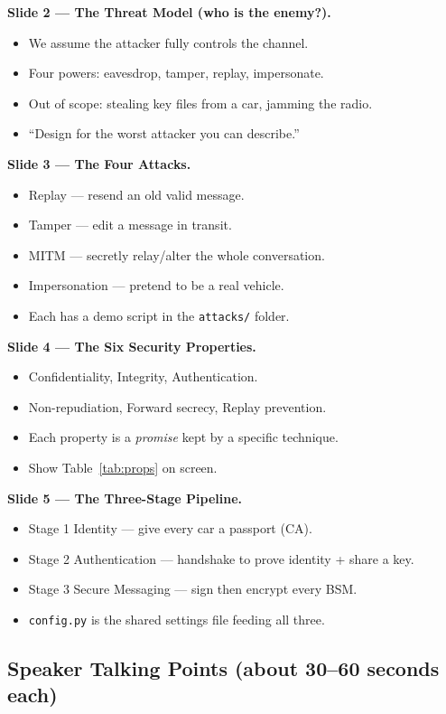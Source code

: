 \documentclass[11pt,a4paper]{report}
\begin{document}
\textbf{Slide 2 --- The Threat Model (who is the enemy?).}
\begin{itemize}
  \item We assume the attacker fully controls the channel.
  \item Four powers: eavesdrop, tamper, replay, impersonate.
  \item Out of scope: stealing key files from a car, jamming the radio.
  \item ``Design for the worst attacker you can describe.''
\end{itemize}

\textbf{Slide 3 --- The Four Attacks.}
\begin{itemize}
  \item Replay --- resend an old valid message.
  \item Tamper --- edit a message in transit.
  \item MITM --- secretly relay/alter the whole conversation.
  \item Impersonation --- pretend to be a real vehicle.
  \item Each has a demo script in the \texttt{attacks/} folder.
\end{itemize}

\textbf{Slide 4 --- The Six Security Properties.}
\begin{itemize}
  \item Confidentiality, Integrity, Authentication.
  \item Non-repudiation, Forward secrecy, Replay prevention.
  \item Each property is a \emph{promise} kept by a specific technique.
  \item Show Table~\ref{tab:props} on screen.
\end{itemize}

\textbf{Slide 5 --- The Three-Stage Pipeline.}
\begin{itemize}
  \item Stage 1 Identity --- give every car a passport (CA).
  \item Stage 2 Authentication --- handshake to prove identity + share a key.
  \item Stage 3 Secure Messaging --- sign then encrypt every BSM.
  \item \texttt{config.py} is the shared settings file feeding all three.
\end{itemize}

\subsection{Speaker Talking Points (about 30--60 seconds each)}
\end{document}
